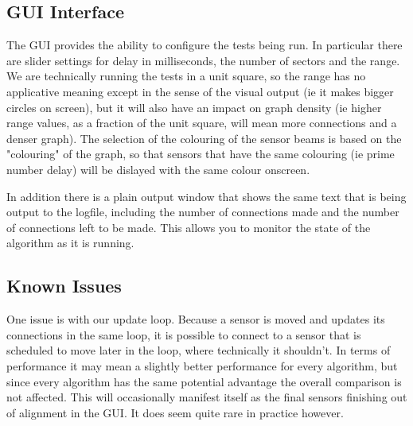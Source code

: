 \subsection{GUI Interface}
The GUI provides the ability to configure the tests being run. In particular there are slider settings for delay in milliseconds, the number of sectors and the range. We are technically running the tests in a unit square, so the range has no applicative meaning except in the sense of the visual output (ie it makes bigger circles on screen), but it will also have an impact on graph density (ie higher range values, as a fraction of the unit square, will mean more connections and a denser graph). The selection of the colouring of the sensor beams is based on the "colouring" of the graph, so that sensors that have the same colouring (ie prime number delay) will be dislayed with the same colour onscreen.

In addition there is a plain output window that shows the same text that is being output to the logfile, including the number of connections made and the number of connections left to be made. This allows you to monitor the state of the algorithm as it is running.

\subsection{Known Issues}
One issue is with our update loop. Because a sensor is moved and updates its connections in the same loop, it is possible to connect to a sensor that is scheduled to move later in the loop, where technically it shouldn't. In terms of performance it may mean a slightly better performance for every algorithm, but since every algorithm has the same potential advantage the overall comparison is not affected. This will occasionally manifest itself as the final sensors finishing out of alignment in the GUI. It does seem quite rare in practice however.
 